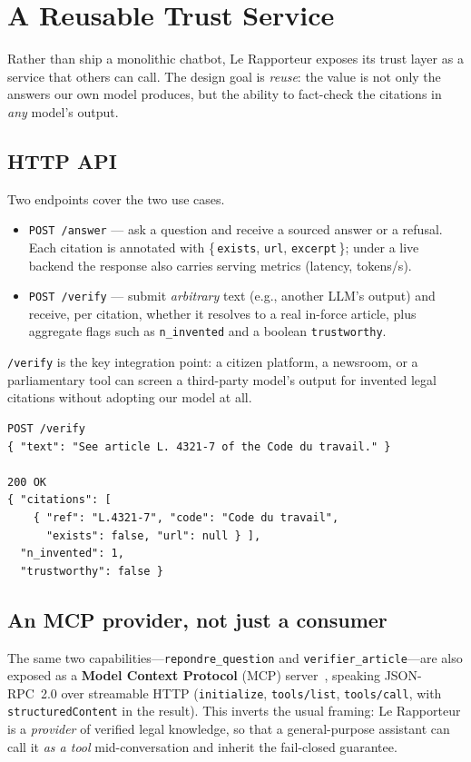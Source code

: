\section{A Reusable Trust Service}
\label{sec:service}

Rather than ship a monolithic chatbot, Le Rapporteur exposes its trust layer as
a service that others can call. The design goal is \emph{reuse}: the value is
not only the answers our own model produces, but the ability to fact-check the
citations in \emph{any} model's output.

\subsection{HTTP API}
Two endpoints cover the two use cases.
\begin{itemize}
  \item \texttt{POST /answer} --- ask a question and receive a sourced answer
  or a refusal. Each citation is annotated with \{\,\texttt{exists},
  \texttt{url}, \texttt{excerpt}\,\}; under a live backend the response also
  carries serving metrics (latency, tokens/s).
  \item \texttt{POST /verify} --- submit \emph{arbitrary} text (e.g., another
  LLM's output) and receive, per citation, whether it resolves to a real
  in-force article, plus aggregate flags such as \texttt{n\_invented} and a
  boolean \texttt{trustworthy}.
\end{itemize}
\texttt{/verify} is the key integration point: a citizen platform, a newsroom,
or a parliamentary tool can screen a third-party model's output for invented
legal citations without adopting our model at all.

\begin{lstlisting}[style=lr]
POST /verify
{ "text": "See article L. 4321-7 of the Code du travail." }

200 OK
{ "citations": [
    { "ref": "L.4321-7", "code": "Code du travail",
      "exists": false, "url": null } ],
  "n_invented": 1,
  "trustworthy": false }
\end{lstlisting}

\subsection{An MCP provider, not just a consumer}
The same two capabilities---\texttt{repondre\_question} and
\texttt{verifier\_article}---are also exposed as a \textbf{Model Context
Protocol} (MCP) server~\cite{mcp2024}, speaking JSON-RPC~2.0 over streamable
HTTP (\texttt{initialize}, \texttt{tools/list}, \texttt{tools/call}, with
\texttt{structuredContent} in the result). This inverts the usual framing: Le
Rapporteur is a \emph{provider} of verified legal knowledge, so that a
general-purpose assistant can call it \emph{as a tool} mid-conversation and
inherit the fail-closed guarantee.


